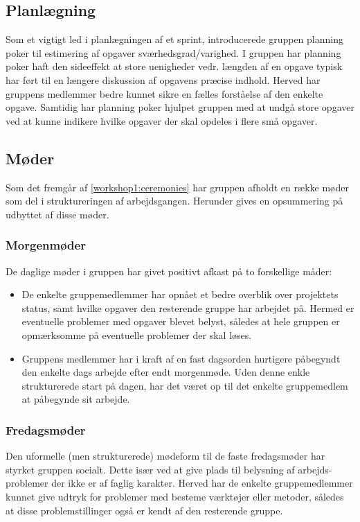 \subsection{Planlægning}
Som et vigtigt led i planlægningen af et sprint, introducerede gruppen planning poker til estimering af opgaver sværhedsgrad/varighed.
I gruppen har planning poker haft den sideeffekt at store uenigheder vedr. længden af en opgave typisk har ført til en længere diskussion af opgavens præcise indhold.
Herved har gruppens medlemmer bedre kunnet sikre en fælles forståelse af den enkelte opgave.
Samtidig har planning poker hjulpet gruppen med at undgå store opgaver ved at kunne indikere hvilke opgaver der skal opdeles i flere små opgaver.

\subsection{Møder}
Som det fremgår af \cref{workshop1:ceremonies} har gruppen afholdt en række møder som del i struktureringen af arbejdsgangen.
Herunder gives en opsummering på udbyttet af disse møder.

\subsubsection{Morgenmøder}
De daglige møder i gruppen har givet positivt afkast på to forskellige måder:
\begin{itemize}
\item De enkelte gruppemedlemmer har opnået et bedre overblik over projektets status, samt hvilke opgaver den resterende gruppe har arbejdet på.
Hermed er eventuelle problemer med opgaver blevet belyst, således at hele gruppen er opmærksomme på eventuelle problemer der skal løses.

\item Gruppens medlemmer har i kraft af en fast dagsorden hurtigere påbegyndt den enkelte dags arbejde efter endt morgenmøde.
Uden denne enkle strukturerede start på dagen, har det været op til det enkelte gruppemedlem at påbegynde sit arbejde.

\end{itemize}

\subsubsection{Fredagsmøder}\label{workshop3:fredag}
Den uformelle (men strukturerede) mødeform til de faste fredagsmøder har styrket gruppen socialt.
Dette især ved at give plads til belysning af arbejds-problemer der ikke er af faglig karakter.
Herved har de enkelte gruppemedlemmer kunnet give udtryk for problemer med besteme værktøjer eller metoder, således at disse problemstillinger også er kendt af den resterende gruppe.

